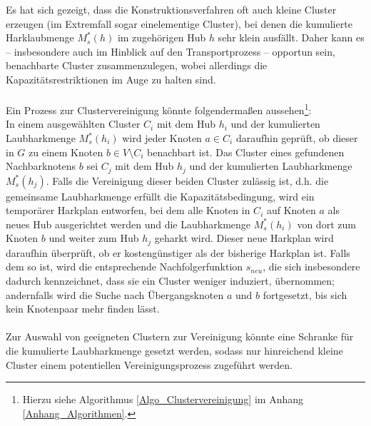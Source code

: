 \documentclass[fontsize=12pt,doubleside,openany,listof=totoc,listof=flat,listof=nochaptergap,numbers=noenddot]{scrbook}
\theoremstyle{style}
\begin{document}
Es hat sich gezeigt, dass die Konstruktionsverfahren oft auch \glqq kleine\grqq{} Cluster erzeugen (im Extremfall sogar einelementige Cluster), bei denen die kumulierte Harklaubmenge $M^*_s(h)$ im zugehörigen Hub $h$ sehr klein ausfällt. Daher kann es -- insbesondere auch im Hinblick auf den Transportprozess -- opportun sein, benachbarte Cluster zusammenzulegen, wobei allerdings die Kapazitätsrestriktionen im Auge zu halten sind. \\
\\
Ein Prozess zur Clustervereinigung könnte folgendermaßen aussehen\footnote{Hierzu siehe Algorithmus \ref{Algo_Clustervereinigung} im Anhang \ref{Anhang_Algorithmen}.}:\\
In einem ausgewählten Cluster $C_i$ mit dem Hub $h_i$ und der kumulierten Laubharkmenge $M^*_s(h_i)$ wird jeder Knoten $a \in C_i$ daraufhin geprüft, ob dieser in $G$ zu einem Knoten $b \in V\setminus C_i$ benachbart ist. Das Cluster eines gefundenen Nachbarknotens $b$ sei $C_j$ mit dem Hub $h_j$ und der kumulierten Laubharkmenge $M^*_s(h_j)$. Falls die Vereinigung dieser beiden Cluster zulässig ist, d.h. die gemeinsame Laubharkmenge erfüllt die Kapazitätsbedingung, wird ein temporärer Harkplan entworfen, bei dem alle Knoten in $C_i$ auf Knoten $a$ als neues Hub ausgerichtet werden und die Laubharkmenge $M^*_s(h_i)$ von dort zum Knoten $b$ und weiter zum Hub $h_j$ geharkt wird. Dieser neue Harkplan wird daraufhin überprüft, ob er kostengünstiger als der bisherige Harkplan ist. Falls dem so ist, wird die entsprechende Nachfolgerfunktion $s_{neu}$, die sich insbesondere dadurch kennzeichnet, dass sie  ein Cluster weniger induziert, übernommen; andernfalls wird die Suche nach \glqq Übergangsknoten\grqq{} $a$ und $b$ fortgesetzt, bis sich kein Knotenpaar mehr finden lässt.\\
\\
Zur Auswahl von geeigneten Clustern zur Vereinigung könnte eine Schranke für die kumulierte Laubharkmenge gesetzt werden, sodass nur hinreichend kleine Cluster einem potentiellen Vereinigungsprozess zugeführt werden.
\end{document}
